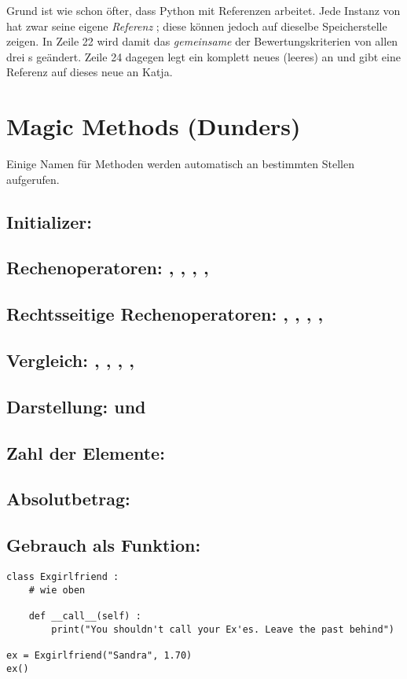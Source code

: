 Grund ist wie schon öfter, dass Python mit Referenzen arbeitet. Jede Instanz von  hat zwar seine eigene \emph{Referenz} ; diese können jedoch auf dieselbe Speicherstelle zeigen. In Zeile 22 wird damit das \emph{gemeinsame}  der Bewertungskriterien von allen drei s geändert. Zeile 24 dagegen legt ein komplett neues (leeres)  an und gibt eine Referenz auf dieses neue  an Katja.

\section{Magic Methods (Dunders)}
Einige Namen für Methoden werden automatisch an bestimmten Stellen aufgerufen. 

\subsection{Initializer: }
\subsection{Rechenoperatoren: , , , , }
\subsection{Rechtsseitige Rechenoperatoren: , , , , }
\subsection{Vergleich: , , , , }
\subsection{Darstellung:  und }
\subsection{Zahl der Elemente: }
\subsection{Absolutbetrag: }
\subsection{Gebrauch als Funktion: }
\begin{codebox}
\begin{verbatim}
class Exgirlfriend :
    # wie oben
    
    def __call__(self) :
        print("You shouldn't call your Ex'es. Leave the past behind")

ex = Exgirlfriend("Sandra", 1.70)
ex()
\end{verbatim}
\end{codebox}

